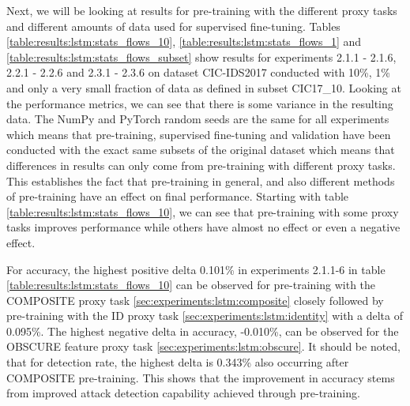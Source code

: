 

Next, we will be looking at results for pre-training with the different proxy tasks and different amounts of data used for supervised fine-tuning. Tables \ref{table:results:lstm:stats_flows_10}, \ref{table:results:lstm:stats_flows_1} and \ref{table:results:lstm:stats_flows_subset} show results for experiments 2.1.1 - 2.1.6, 2.2.1 - 2.2.6 and 2.3.1 - 2.3.6 on dataset CIC-IDS2017 conducted with 10\%, 1\% and only a very small fraction of data as defined in subset CIC17\_10. Looking at the performance metrics, we can see that there is some variance in the resulting data. The NumPy and PyTorch random seeds are the same for all experiments which means that pre-training, supervised fine-tuning and validation have been conducted with the exact same subsets of the original dataset which means that differences in results can only come from pre-training with different proxy tasks. This establishes the fact that pre-training in general, and also different methods of pre-training have an effect on final performance. Starting with table \ref{table:results:lstm:stats_flows_10}, we can see that pre-training with some proxy tasks improves performance while others have almost no effect or even a negative effect. \par





For accuracy, the highest positive delta 0.101\% in experiments 2.1.1-6 in table \ref{table:results:lstm:stats_flows_10} can be observed for pre-training with the COMPOSITE proxy task \ref{sec:experiments:lstm:composite} closely followed by pre-training with the ID proxy task \ref{sec:experiments:lstm:identity} with a delta of 0.095\%. The highest negative delta in accuracy, -0.010\%, can be observed for the OBSCURE feature proxy task \ref{sec:experiments:lstm:obscure}. It should be noted, that for detection rate, the highest delta is 0.343\% also occurring after COMPOSITE pre-training. This shows that the improvement in accuracy stems from improved attack detection capability achieved through pre-training. \par





